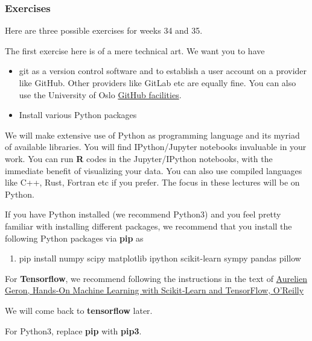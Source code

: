 \documentclass{beamer}
\newenvironment{doconceexercise}{}{}
\newcounter{doconceexercisecounter}
\newcounter{doconce:movie:counter}
\begin{document}
\begin{frame}
\frametitle{Exercises}

Here are three possible exercises for weeks 34 and  35.

\begin{doconceexercise}

                             

The first exercise here is of a mere technical art. We want you to have 
\begin{itemize}
\item git as a version control software and to establish a user account on a provider like GitHub. Other providers like GitLab etc are equally fine. You can also use the University of Oslo \href{{https://www.uio.no/tjenester/it/maskin/filer/versjonskontroll/github.html}}{GitHub facilities}. 

\item Install various Python packages
\end{itemize}

\noindent
We will make extensive use of Python as programming language and its
myriad of available libraries.  You will find
IPython/Jupyter notebooks invaluable in your work.  You can run \textbf{R}
codes in the Jupyter/IPython notebooks, with the immediate benefit of
visualizing your data. You can also use compiled languages like C++,
Rust, Fortran etc if you prefer. The focus in these lectures will be
on Python.

If you have Python installed (we recommend Python3) and you feel
pretty familiar with installing different packages, we recommend that
you install the following Python packages via \textbf{pip} as 

\begin{enumerate}
\item pip install numpy scipy matplotlib ipython scikit-learn sympy pandas pillow 
\end{enumerate}

\noindent
For \textbf{Tensorflow}, we recommend following the instructions in the text of 
\href{{http://shop.oreilly.com/product/0636920052289.do}}{Aurelien Geron, Hands‑On Machine Learning with Scikit‑Learn and TensorFlow, O'Reilly}

We will come back to \textbf{tensorflow} later. 

For Python3, replace \textbf{pip} with \textbf{pip3}.


\end{doconceexercise}
\end{frame}
\end{document}
